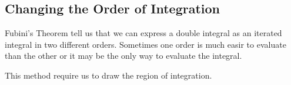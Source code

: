 
\subsection{Changing the Order of Integration}

Fubini's Theorem tell us that we can express a double integral as an iterated integral in two different orders.
Sometimes one order is much easir to evaluate than the other or it may be the only way to evaluate the integral.

\begin{remark}
  This method require us to draw the region of integration.
\end{remark}

